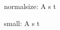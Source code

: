 \documentclass{article}
\begin{document}
\def\text{\Cplusplus\ \LaTeX}
\def\text{$A^{b^c}$}
\def\text{A \scriptsize s \tiny t}
normalsize: \text

{\small small: \text \par}
\end{document}
